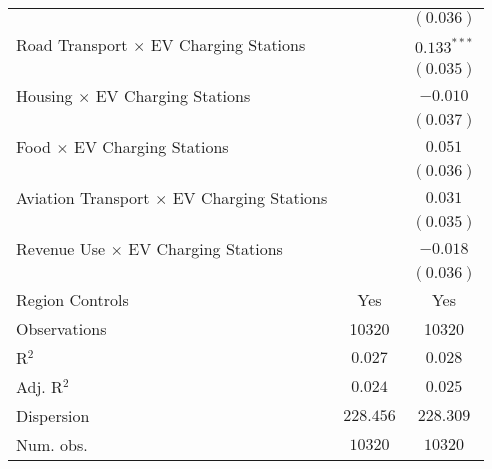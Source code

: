 \begin{center}
\begin{tiny}
\begin{longtable}{l@{} c@{} c@{}}
                                                         &                  & $(0.036)$        \\
\quad Road Transport $\times$ EV Charging Stations       &                  & $0.133^{***}$    \\
                                                         &                  & $(0.035)$        \\
\quad Housing $\times$ EV Charging Stations              &                  & $-0.010$         \\
                                                         &                  & $(0.037)$        \\
\quad Food $\times$ EV Charging Stations                 &                  & $0.051$          \\
                                                         &                  & $(0.036)$        \\
\quad Aviation Transport $\times$ EV Charging Stations   &                  & $0.031$          \\
                                                         &                  & $(0.035)$        \\
\quad Revenue Use $\times$ EV Charging Stations          &                  & $-0.018$         \\
                                                         &                  & $(0.036)$        \\
\hline
Region Controls                                          & Yes              & Yes              \\
Observations                                             & 10320            & 10320            \\
R$^2$                                                    & $0.027$          & $0.028$          \\
Adj. R$^2$                                               & $0.024$          & $0.025$          \\
Dispersion                                               & $228.456$        & $228.309$        \\
Num. obs.                                                & $10320$          & $10320$          \\
\end{longtable}
\end{tiny}
\end{center}
